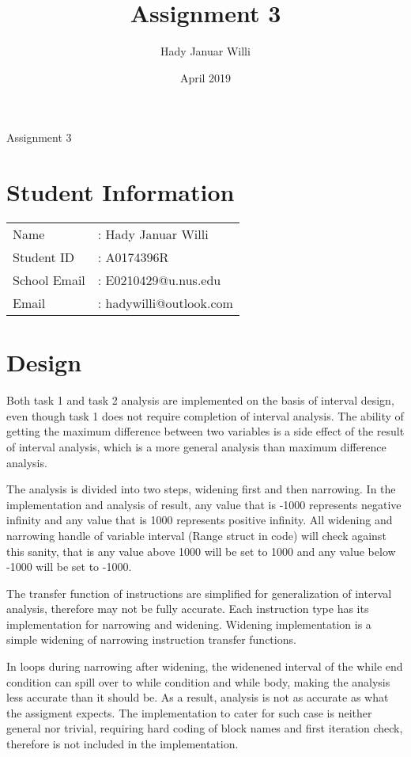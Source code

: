 \documentclass[11pt,a4paper,fleqn]{article}
\title{Assignment 3}
\author{Hady Januar Willi}
\date{April 2019}
\begin{document}
\begin{center}
   \LARGE Assignment 3
\end{center}
\section{Student Information}

\begin{tabular}{l l}
   Name         & : Hady Januar Willi     \\
   Student ID   & : A0174396R             \\
   School Email & : E0210429@u.nus.edu    \\
   Email        & : hadywilli@outlook.com \\
\end{tabular}

\section{Design}

Both task 1 and task 2 analysis are implemented on the basis of interval design, even though task 1 does not require completion of interval analysis.
The ability of getting the maximum difference between two variables is a side effect of the result of interval analysis, which is a more general analysis than maximum difference analysis.

The analysis is divided into two steps, widening first and then narrowing.
In the implementation and analysis of result, any value that is -1000 represents negative infinity and any value that is 1000 represents positive infinity.
All widening and narrowing handle of variable interval (Range struct in code) will check against this sanity, that is any value above 1000 will be set to 1000 and any value below -1000 will be set to -1000.

The transfer function of instructions are simplified for generalization of interval analysis, therefore may not be fully accurate.
Each instruction type has its implementation for narrowing and widening.
Widening implementation is a simple widening of narrowing instruction transfer functions.

In loops during narrowing after widening, the widenened interval of the while end condition can spill over to while condition and while body, making the analysis less accurate than it should be.
As a result, analysis is not as accurate as what the assigment expects.
The implementation to cater for such case is neither general nor trivial, requiring hard coding of block names and first iteration check, therefore is not included in the implementation.
\end{document}
